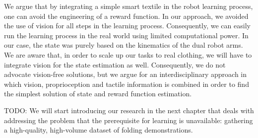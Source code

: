 \documentclass[\home/main.tex]{subfiles}
\begin{document}
We argue that by integrating a simple smart textile in the robot learning process, one can avoid the engineering of a reward function. In our approach, we avoided the use of vision for all steps in the learning process. Consequently, we can easily run the learning process in the real world using limited computational power. In our case, the state was purely based on the kinematics of the dual robot arms. We are aware that, in order to scale up our tasks to real clothing, we will have to integrate vision for the state estimation as well. Consequently, we do not advocate vision-free solutions, but we argue for an interdisciplinary approach in which vision, proprioception and tactile information is combined in order to find the simplest solution of state and reward function estimation.


TODO:
We will start introducing our research in the next chapter that deals with addressing the problem that the prerequisite for learning is unavailable: gathering a high-quality, high-volume dataset of folding demonstrations.
\end{document}
